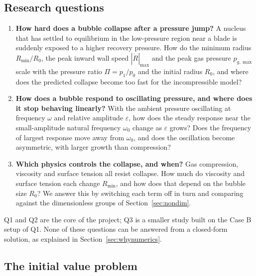 \subsection{Research questions}\label{sec:questions}

\begin{enumerate}
  \item[\textbf{Q1.}] \textbf{How hard does a bubble collapse after a pressure jump?}
  A nucleus that has settled to equilibrium in the low-pressure region near a blade is
  suddenly exposed to a higher recovery pressure. How do the minimum radius
  $R_{\min}/R_0$, the peak inward wall speed $|\dot R|_{\max}$ and the peak gas pressure
  $p_{g,\max}$ scale with the pressure ratio $\Pi = p_1/p_0$ and the initial radius $R_0$,
  and where does the predicted collapse become too fast for the incompressible model?

  \item[\textbf{Q2.}] \textbf{How does a bubble respond to oscillating pressure, and where does it
  stop behaving linearly?} With the ambient pressure oscillating at frequency $\omega$ and
  relative amplitude $\varepsilon$, how does the steady response near the small-amplitude
  natural frequency $\omega_0$ change as $\varepsilon$ grows? Does the frequency of largest
  response move away from $\omega_0$, and does the oscillation become asymmetric, with
  larger growth than compression?

  \item[\textbf{Q3.}] \textbf{Which physics controls the collapse, and when?} Gas compression,
  viscosity and surface tension all resist collapse. How much do viscosity and surface
  tension each change $R_{\min}$, and how does that depend on the bubble size $R_0$? We
  answer this by switching each term off in turn and comparing against the dimensionless
  groups of Section~\ref{sec:nondim}.
\end{enumerate}

Q1 and Q2 are the core of the project; Q3 is a smaller study built on the Case B setup of Q1.
None of these questions can be answered from a closed-form solution, as explained in
Section~\ref{sec:whynumerics}.

\subsection{The initial value problem}\label{sec:ivp}

